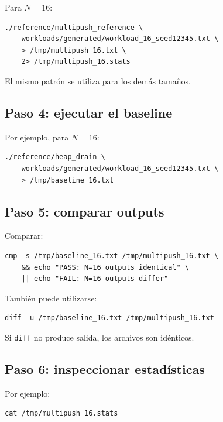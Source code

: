 \documentclass[11pt,a4paper]{article}
\begin{document}
Para $N=16$:

\begin{lstlisting}[style=terminal]
./reference/multipush_reference \
    workloads/generated/workload_16_seed12345.txt \
    > /tmp/multipush_16.txt \
    2> /tmp/multipush_16.stats
\end{lstlisting}

El mismo patrón se utiliza para los demás tamaños.

\subsection{Paso 4: ejecutar el baseline}

Por ejemplo, para $N=16$:

\begin{lstlisting}[style=terminal]
./reference/heap_drain \
    workloads/generated/workload_16_seed12345.txt \
    > /tmp/baseline_16.txt
\end{lstlisting}

\subsection{Paso 5: comparar outputs}

Comparar:

\begin{lstlisting}[style=terminal]
cmp -s /tmp/baseline_16.txt /tmp/multipush_16.txt \
    && echo "PASS: N=16 outputs identical" \
    || echo "FAIL: N=16 outputs differ"
\end{lstlisting}

También puede utilizarse:

\begin{lstlisting}[style=terminal]
diff -u /tmp/baseline_16.txt /tmp/multipush_16.txt
\end{lstlisting}

Si \texttt{diff} no produce salida, los archivos son idénticos.

\subsection{Paso 6: inspeccionar estadísticas}

Por ejemplo:

\begin{lstlisting}[style=terminal]
cat /tmp/multipush_16.stats
\end{lstlisting}
\end{document}
